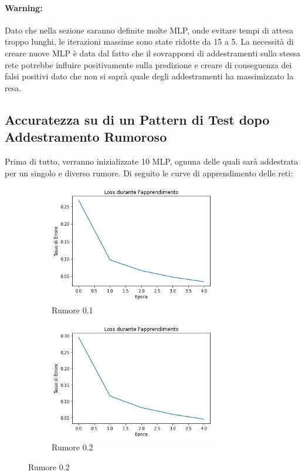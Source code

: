 \documentclass[12pt, a4paper]{article}
\begin{document}
\paragraph{Warning:} Dato che nella sezione saranno definite molte MLP, onde evitare tempi di attesa troppo lunghi, le iterazioni massime sono state ridotte da 15 a 5. La necessità di creare nuove MLP è data dal fatto che il sovrapporsi di addestramenti sulla stessa rete potrebbe influire positivamente sulla predizione e creare di conseguenza dei falsi positivi dato che non si saprà quale degli addestramenti ha massimizzato la resa.
\subsection{Accuratezza su di un Pattern di Test dopo Addestramento Rumoroso}
Prima di tutto, verranno inizializzate 10 MLP, ognuna delle quali sarà addestrata per un singolo e diverso rumore. Di seguito le curve di apprendimento delle reti:
\begin{figure}[H]
    \begin{subfigure}{0.5\textwidth}
        \centering
        \caption{Rumore 0.1}
        \includegraphics[width=0.80\textwidth]{Rumore1.png}
    \end{subfigure}
    \begin{subfigure}{0.5\textwidth}
        \centering
        \caption{Rumore 0.2}
        \includegraphics[width=0.80\textwidth]{Rumore2.png}
    \end{subfigure}    
\end{figure}
\end{document}
